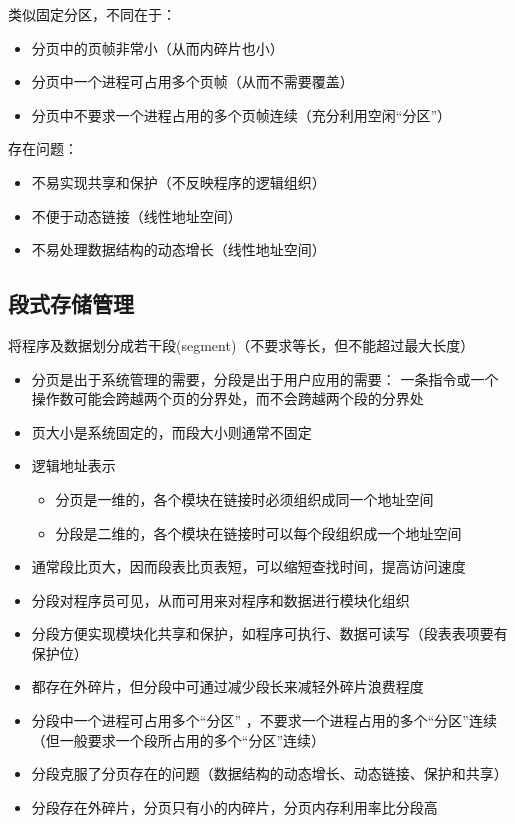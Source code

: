 类似固定分区，不同在于：
\begin{itemize}
    \item 分页中的页帧非常小（从而内碎片也小）
    \item 分页中一个进程可占用多个页帧（从而不需要覆盖）
    \item 分页中不要求一个进程占用的多个页帧连续（充分利用空闲“分区”）
\end{itemize}

存在问题：
\begin{itemize}
\item 不易实现共享和保护（不反映程序的逻辑组织）
\item 不便于动态链接（线性地址空间）
\item 不易处理数据结构的动态增长（线性地址空间）
\end{itemize}

\subsection{段式存储管理}
将程序及数据划分成若干段(segment)（不要求等长，但不能超过最大长度）
\begin{itemize}
    \item 分页是出于系统管理的需要，分段是出于用户应用的需要：
    一条指令或一个操作数可能会跨越两个页的分界处，而不会跨越两个段的分界处
    \item 页大小是系统固定的，而段大小则通常不固定
    \item 逻辑地址表示
    \begin{itemize}
        \item 分页是一维的，各个模块在链接时必须组织成同一个地址空间
        \item 分段是二维的，各个模块在链接时可以每个段组织成一个地址空间
    \end{itemize}
    \item 通常段比页大，因而段表比页表短，可以缩短查找时间，提高访问速度
    \item 分段对程序员可见，从而可用来对程序和数据进行模块化组织
    \item 分段方便实现模块化共享和保护，如程序可执行、数据可读写（段表表项要有保护位）
    \item 都存在外碎片，但分段中可通过减少段长来减轻外碎片浪费程度
    \item 分段中一个进程可占用多个“分区” ，不要求一个进程占用的多个“分区”连续（但一般要求一个段所占用的多个“分区”连续）
    \item 分段克服了分页存在的问题（数据结构的动态增长、动态链接、保护和共享）
    \item 分段存在外碎片，分页只有小的内碎片，分页内存利用率比分段高
\end{itemize}

